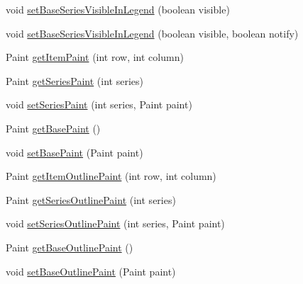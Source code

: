 \begin{DoxyCompactItemize}
\item 
void \mbox{\hyperlink{interfaceorg_1_1jfree_1_1chart_1_1renderer_1_1xy_1_1_x_y_item_renderer_ada7d9dbe2c39453f0f453cb569f63dde}{set\+Base\+Series\+Visible\+In\+Legend}} (boolean visible)
\item 
void \mbox{\hyperlink{interfaceorg_1_1jfree_1_1chart_1_1renderer_1_1xy_1_1_x_y_item_renderer_a2f25194d093c7be114c5119456e584cb}{set\+Base\+Series\+Visible\+In\+Legend}} (boolean visible, boolean notify)
\item 
Paint \mbox{\hyperlink{interfaceorg_1_1jfree_1_1chart_1_1renderer_1_1xy_1_1_x_y_item_renderer_a7c9301a7699a6878a0bdc93635404fbc}{get\+Item\+Paint}} (int row, int column)
\item 
Paint \mbox{\hyperlink{interfaceorg_1_1jfree_1_1chart_1_1renderer_1_1xy_1_1_x_y_item_renderer_a8931da4b274b83b939fc55f3f0b664a4}{get\+Series\+Paint}} (int series)
\item 
void \mbox{\hyperlink{interfaceorg_1_1jfree_1_1chart_1_1renderer_1_1xy_1_1_x_y_item_renderer_aeae40c1db9ca25301052d076e7d06b46}{set\+Series\+Paint}} (int series, Paint paint)
\item 
Paint \mbox{\hyperlink{interfaceorg_1_1jfree_1_1chart_1_1renderer_1_1xy_1_1_x_y_item_renderer_ad429a253d5c1272c0fd26ed0a5cd912c}{get\+Base\+Paint}} ()
\item 
void \mbox{\hyperlink{interfaceorg_1_1jfree_1_1chart_1_1renderer_1_1xy_1_1_x_y_item_renderer_a94441ac79f4d2a5cc99fc038011b7371}{set\+Base\+Paint}} (Paint paint)
\item 
Paint \mbox{\hyperlink{interfaceorg_1_1jfree_1_1chart_1_1renderer_1_1xy_1_1_x_y_item_renderer_a2050da09caa68a91809cb20a53edf3c6}{get\+Item\+Outline\+Paint}} (int row, int column)
\item 
Paint \mbox{\hyperlink{interfaceorg_1_1jfree_1_1chart_1_1renderer_1_1xy_1_1_x_y_item_renderer_a6d212ddcea5d74f8723d7caa2d62a34a}{get\+Series\+Outline\+Paint}} (int series)
\item 
void \mbox{\hyperlink{interfaceorg_1_1jfree_1_1chart_1_1renderer_1_1xy_1_1_x_y_item_renderer_a4d95cde662d19b7a5d28210264336549}{set\+Series\+Outline\+Paint}} (int series, Paint paint)
\item 
Paint \mbox{\hyperlink{interfaceorg_1_1jfree_1_1chart_1_1renderer_1_1xy_1_1_x_y_item_renderer_a3b0b7659139c245b83ce5436885c1bde}{get\+Base\+Outline\+Paint}} ()
\item 
void \mbox{\hyperlink{interfaceorg_1_1jfree_1_1chart_1_1renderer_1_1xy_1_1_x_y_item_renderer_a6b3684a8366e68b2b647b43e5ef200a7}{set\+Base\+Outline\+Paint}} (Paint paint)

\end{DoxyCompactItemize}
